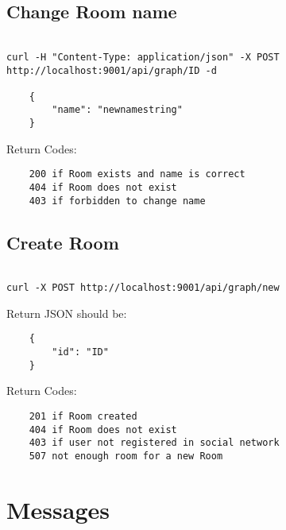 \documentclass[12pt]{article}
\begin{document}
\filbreak
\subsection{Change Room name}

\begin{verbatim}

curl -H "Content-Type: application/json" -X POST http://localhost:9001/api/graph/ID -d 

    { 
        "name": "newnamestring" 
    }

\end{verbatim}

Return Codes:
\begin{verbatim}
    200 if Room exists and name is correct
    404 if Room does not exist
    403 if forbidden to change name
\end{verbatim}




\filbreak
\subsection{Create Room}

\begin{verbatim}

curl -X POST http://localhost:9001/api/graph/new

\end{verbatim}

Return JSON should be:

\begin{verbatim}
    { 
        "id": "ID" 
    }

\end{verbatim}

Return Codes:
\begin{verbatim}
    201 if Room created
    404 if Room does not exist
    403 if user not registered in social network
    507 not enough room for a new Room
\end{verbatim}



\section{Messages}
\end{document}
